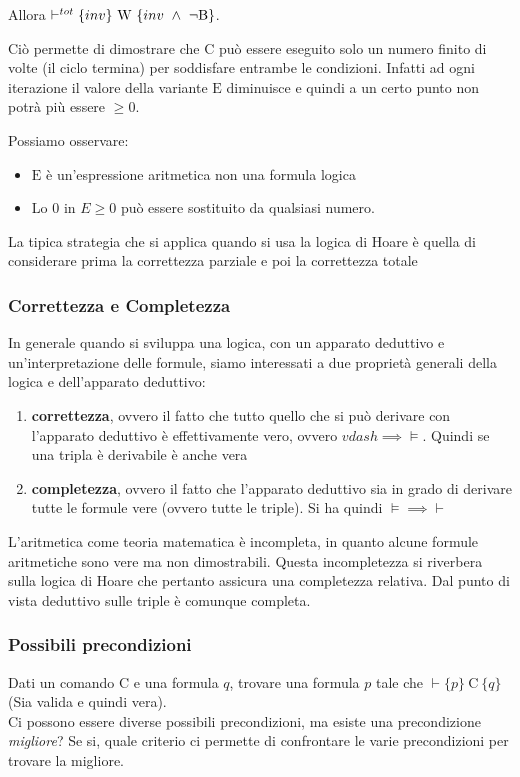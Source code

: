  Allora $\vdash^{tot} \{inv\} \ \textnormal{W} \ \{inv \ \land \ \neg \textnormal{B} \}$.

Ciò permette di dimostrare che $\text{C}$ può essere eseguito solo un numero finito di volte (il ciclo termina) per soddisfare entrambe le condizioni. Infatti ad ogni iterazione il valore della variante $\text{E}$ diminuisce e quindi a un certo punto non potrà più essere $\geq 0$.

Possiamo osservare: 
\begin{itemize}
    \item $\text{E}$ è un’espressione aritmetica non una formula logica
    \item Lo $0$ in $E \geq 0$ può essere sostituito da qualsiasi numero.
\end{itemize}
La tipica strategia che si applica quando si usa la logica di Hoare è quella di considerare prima la correttezza parziale e poi la correttezza totale

\subsubsection{Correttezza e Completezza}
In generale quando si sviluppa una logica, con un apparato deduttivo e un'interpretazione delle formule, siamo interessati a due proprietà generali della logica e dell'apparato deduttivo: 
\begin{enumerate}
    \item \textbf{correttezza}, ovvero il fatto che tutto quello che si può derivare con l'apparato deduttivo è effettivamente vero, ovvero $vdash\implies\vDash$. Quindi se una tripla è derivabile è anche vera 
    \item \textbf{completezza}, ovvero il fatto che l'apparato deduttivo sia in grado di derivare tutte le formule vere (ovvero tutte le triple). Si ha quindi $\vDash\implies\vdash$
\end{enumerate}

L’aritmetica come teoria matematica è incompleta, in quanto alcune formule aritmetiche sono vere ma non dimostrabili. Questa incompletezza si riverbera sulla logica di Hoare che pertanto assicura una completezza relativa. Dal punto di vista deduttivo sulle triple è comunque completa. 

\subsubsection{Possibili precondizioni}

Dati un comando $\text{C}$ e una formula $q$, trovare una formula $p$ tale che $\vdash \{p\} \ \text{C} \ \{q\}$ (Sia valida e quindi vera). 
\\
Ci possono essere diverse possibili precondizioni, ma esiste una precondizione \textit{migliore}? Se si, quale criterio ci permette di confrontare le varie precondizioni per trovare la migliore. 

